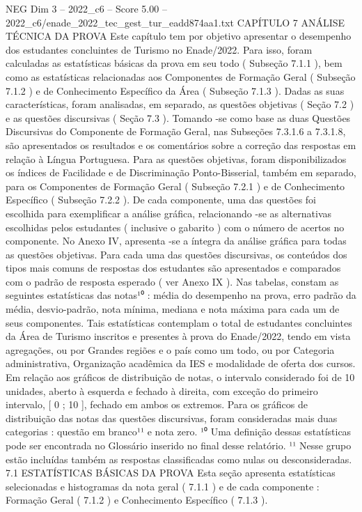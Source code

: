 \begin{textsample}{NEG Dim 3 – 2022\_c6 – Score 5.00 – 2022\_c6/enade\_2022\_tec\_gest\_tur\_eadd874aa1.txt}  \label{ex:f3_neg_263}
CAPÍTULO 7 ANÁLISE TÉCNICA DA PROVA Este capítulo tem por objetivo apresentar o desempenho dos estudantes concluintes de Turismo no Enade/2022.
Para isso, foram calculadas as estatísticas básicas da prova em seu todo ( Subseção 7.1.1 ), bem como as estatísticas relacionadas aos Componentes de Formação Geral ( Subseção 7.1.2 ) e de Conhecimento Específico da Área ( Subseção 7.1.3 ).
Dadas as suas características, foram analisadas, em separado, as questões objetivas ( Seção 7.2 ) e as questões discursivas ( Seção 7.3 ).
Tomando -se como base as duas Questões Discursivas do Componente de Formação Geral, nas Subseções 7.3.1.6 a 7.3.1.8, são apresentados os resultados e os comentários sobre a correção das respostas em relação à Língua Portuguesa.
Para as questões objetivas, foram disponibilizados os índices de Facilidade e de Discriminação Ponto-Bisserial, também em separado, para os Componentes de Formação Geral ( Subseção 7.2.1 ) e de Conhecimento Específico ( Subseção 7.2.2 ).
De cada componente, uma das questões foi escolhida para exemplificar a análise gráfica, relacionando -se as alternativas escolhidas pelos estudantes ( inclusive o gabarito ) com o número de acertos no componente.
No Anexo IV, apresenta -se a íntegra da análise gráfica para todas as questões objetivas.
Para cada uma das questões discursivas, os conteúdos dos tipos mais comuns de respostas dos estudantes são apresentados e comparados com o padrão de resposta esperado ( ver Anexo IX ).
Nas tabelas, constam as seguintes estatísticas das notas¹⁰ : média do desempenho na prova, erro padrão da média, desvio-padrão, nota mínima, mediana e nota máxima para cada um de seus componentes.
Tais estatísticas contemplam o total de estudantes concluintes da Área de Turismo inscritos e presentes à prova do Enade/2022, tendo em vista agregações, ou por Grandes regiões e o país como um todo, ou por Categoria administrativa, Organização acadêmica da IES e modalidade de oferta dos cursos.
Em relação aos gráficos de distribuição de notas, o intervalo considerado foi de 10 unidades, aberto à esquerda e fechado à direita, com exceção do primeiro intervalo, [ 0 ; 10 ], fechado em ambos os extremos.
Para os gráficos de distribuição das notas das questões discursivas, foram consideradas mais duas categorias : questão em branco¹¹ e nota zero. ¹⁰ Uma definição dessas estatísticas pode ser encontrada no Glossário inserido no final desse relatório. ¹¹ Nesse grupo estão incluídas também as respostas classificadas como nulas ou desconsideradas. 7.1 ESTATÍSTICAS BÁSICAS DA PROVA Esta seção apresenta estatísticas selecionadas e histogramas da nota geral ( 7.1.1 ) e de cada componente : Formação Geral ( 7.1.2 ) e Conhecimento Específico ( 7.1.3 ).

\end{textsample}

